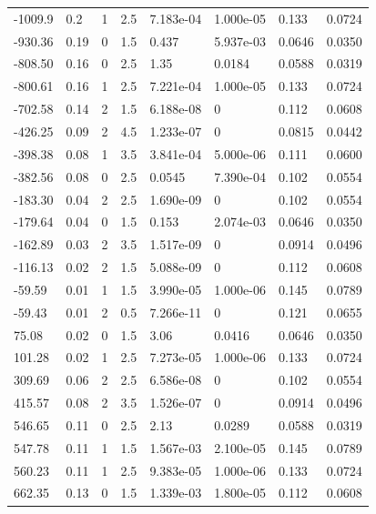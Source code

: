\documentclass[preview]{standalone}
\begin{document}
{{\begin{tabular}{L{1.2cm}C{1.2cm} C{0.3cm}C{0.5cm} C{1.4cm}C{1.4cm} C{1.4cm}C{1.4cm}}
  -1009.9  &   0.2  & 1     & 2.5 &  7.183e-04  & 1.000e-05  & 0.133 &  0.0724   \\ 
  -930.36  &  0.19  & 0     & 1.5 &  0.437  & 5.937e-03  & 0.0646 &  0.0350   \\ 
  -808.50  &  0.16  & 0     & 2.5 &  1.35  & 0.0184  & 0.0588 &  0.0319   \\ 
  -800.61  &  0.16  & 1     & 2.5 &  7.221e-04  & 1.000e-05  & 0.133 &  0.0724   \\ 
  -702.58  &  0.14  & 2     & 1.5 &  6.188e-08  & 0  & 0.112 &  0.0608   \\ 
  -426.25  &  0.09  & 2     & 4.5 &  1.233e-07  & 0  & 0.0815 &  0.0442   \\ 
  -398.38  &  0.08  & 1     & 3.5 &  3.841e-04  & 5.000e-06  & 0.111 &  0.0600   \\ 
  -382.56  &  0.08  & 0     & 2.5 &  0.0545  & 7.390e-04  & 0.102 &  0.0554   \\ 
  -183.30  &  0.04  & 2     & 2.5 &  1.690e-09  & 0  & 0.102 &  0.0554   \\ 
  -179.64  &  0.04  & 0     & 1.5 &  0.153  & 2.074e-03  & 0.0646 &  0.0350   \\ 
  -162.89  &  0.03  & 2     & 3.5 &  1.517e-09  & 0  & 0.0914 &  0.0496   \\ 
  -116.13  &  0.02  & 2     & 1.5 &  5.088e-09  & 0  & 0.112 &  0.0608   \\ 
  -59.59  &  0.01  & 1     & 1.5 &  3.990e-05  & 1.000e-06  & 0.145 &  0.0789   \\ 
  -59.43  &  0.01  & 2     & 0.5 &  7.266e-11  & 0  & 0.121 &  0.0655   \\ 
  75.08  &  0.02  & 0     & 1.5 &  3.06  & 0.0416  & 0.0646 &  0.0350   \\ 
  101.28  &  0.02  & 1     & 2.5 &  7.273e-05  & 1.000e-06  & 0.133 &  0.0724   \\ 
  309.69  &  0.06  & 2     & 2.5 &  6.586e-08  & 0  & 0.102 &  0.0554   \\ 
  415.57  &  0.08  & 2     & 3.5 &  1.526e-07  & 0  & 0.0914 &  0.0496   \\ 
  546.65  &  0.11  & 0     & 2.5 &  2.13  & 0.0289  & 0.0588 &  0.0319   \\ 
  547.78  &  0.11  & 1     & 1.5 &  1.567e-03  & 2.100e-05  & 0.145 &  0.0789   \\ 
  560.23  &  0.11  & 1     & 2.5 &  9.383e-05  & 1.000e-06  & 0.133 &  0.0724   \\ 
  662.35  &  0.13  & 0     & 1.5 &  1.339e-03  & 1.800e-05  & 0.112 &  0.0608   \\ 

\end{tabular}}}
\end{document}
